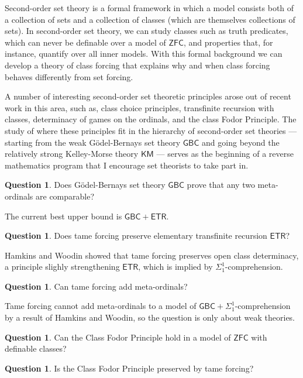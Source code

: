 \documentclass{amsart}
\theoremstyle{definition}
\newtheorem{question}[theorem]{Question}
\newcommand{\ZFC}{\mathsf{ZFC}}
\newcommand{\Godel}{G\"{o}del}
\newcommand{\GBC}{\mathsf{GBC}}
\newcommand{\KM}{\mathsf{KM}}
\newcommand{\ETR}{\mathsf{ETR}}
\begin{document}
Second-order set theory is a formal framework in which a model consists both of a collection of sets and a collection of classes (which are themselves collections of sets). In second-order set theory, we can study classes such as truth predicates, which can never be definable over a model of $\ZFC$, and properties that, for instance, quantify over all inner models. With this formal background we can develop a theory of class forcing that explains why and when class forcing behaves differently from set forcing. 


A number of interesting second-order set theoretic principles arose out of recent work in this area, such as, class choice principles, transfinite recursion with classes, determinacy of games on the ordinals, and the class Fodor Principle. The study of where these principles fit in the hierarchy of second-order set theories --- starting from the weak G\"odel-Bernays set theory $\GBC$ and going beyond the relatively strong Kelley-Morse theory $\KM$ --- serves as the beginning of a reverse mathematics program that I encourage set theorists to take part in.

\begin{question}
Does \Godel-Bernays set theory $\GBC$ prove that any two meta-ordinals are comparable?
\end{question}
The current best upper bound is $\GBC+\ETR$.
\begin{question}
Does tame forcing preserve elementary transfinite recursion $\ETR$?
\end{question}
Hamkins and Woodin showed that tame forcing preserves open class determinacy, a principle slighly strengthening $\ETR$, which is implied by $\Sigma^1_1$-comprehension. 
\begin{question}
Can tame forcing add meta-ordinals? 
\end{question}
Tame forcing cannot add meta-ordinals to a model of $\GBC+\Sigma^1_1$-comprehension by a result of Hamkins and Woodin, so the question is only about weak theories.
\begin{question}
Can the Class Fodor Principle hold in a model of $\ZFC$ with definable classes? 
\end{question}
\begin{question}
Is the Class Fodor Principle preserved by tame forcing?
\end{question}
\end{document}
